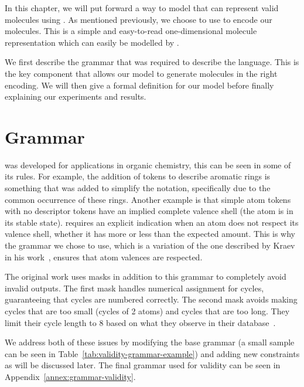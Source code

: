 \documentclass[../Document.tex]{subfiles}
\begin{document}
\label{chap:cp-validity}

In this chapter, we will put forward a way to model that can represent valid molecules using \cp.
As mentioned previously, we choose to use \smiles to encode our molecules. This is a simple and easy-to-read one-dimensional molecule representation which can easily be modelled by \cp.

We first describe the grammar that was required to describe the \smiles language. This is the key component that allows our model to generate molecules in the right encoding. We will then give a formal definition for our model before finally explaining our experiments and results.


\section{\smiles Grammar}
\label{sec:smiles-valid-grammar}
\smiles was developed for applications in organic chemistry, this can be seen in some of its rules. For example, the addition of tokens to describe aromatic rings is something that was added to simplify the notation, specifically due to the common occurrence of these rings. Another example is that simple atom tokens with no descriptor tokens have an implied complete valence shell (\ie the atom is in its stable state). \smiles requires an explicit indication when an atom does not respect its valence shell, whether it has more or less than the expected amount. This is why the grammar we chose to use, which is a variation of the one described by Kraev in his work~\cite{kraev2018grammars}, ensures that atom valences are respected.

The original work uses masks in addition to this grammar to completely avoid invalid outputs.
The first mask handles numerical assignment for cycles, guaranteeing that cycles are numbered correctly.
The second mask avoids making cycles that are too small (\ie cycles of 2 atoms) and cycles that are too long. They limit their cycle length to 8 based on what they observe in their database~\cite{kraev2018grammars}.

We address both of these issues by modifying the base grammar (a small sample can be seen in Table~\ref{tab:validity-grammar-example}) and adding new constraints as will be discussed later. The final grammar used for validity can be seen in Appendix~\ref{annex:grammar-validity}.
\end{document}
